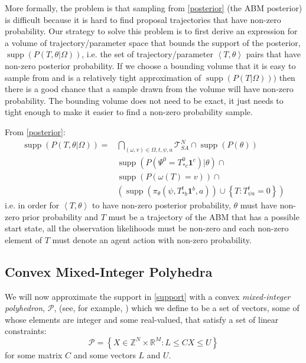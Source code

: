 \documentclass{article}
\DeclareMathOperator\supp{supp}
\begin{document}
More formally, the problem is that sampling from \eqref{posterior} (the ABM posterior) is difficult because it is hard to find proposal trajectories that have non-zero probability. Our strategy to solve this problem is to first derive an expression for a volume of trajectory/parameter space that bounds the support of the posterior, $\supp(P(T,\theta|\Omega))$, i.e. the set of trajectory/parameter $\left<T,\theta\right>$ pairs that have non-zero posterior probability. If we choose a bounding volume that it is easy to sample from and is a relatively tight approximation of $\supp(P(T|\Omega)))$ then there is a good chance that a sample drawn from the volume will have non-zero probability. The bounding volume does not need to be exact, it just needs to tight enough to make it easier to find a non-zero probability sample.

From \eqref{posterior}:
\begin{equation}
\begin{aligned}
\supp (P( T,\theta |\Omega)) = 
& \bigcap_{(\omega,v) \in \Omega,t, \psi, a} \mathcal{T}^N_{SA} \cap \supp(P(\theta)) \\ 
&\supp(P(\Psi^0 = T^0_{* c}\mathbf{1}^c)|\theta) \cap \\
& \supp\left(P\left(\omega(T)=v\right)\right) \cap \\
&\left( \supp\left(\pi_\theta(\psi,T^t_{* b}\mathbf{1}^b,a)\right) \cup \left\{T:T^t_{\psi a} = 0\right\} \right)
\end{aligned}
\label{support}
\end{equation}
i.e. in order for $\left<T,\theta\right>$ to have non-zero posterior probability, $\theta$ must have non-zero prior probability and $T$ must be a trajectory of the ABM that has a possible start state, all the observation likelihoods must be non-zero and each non-zero element of $T$ must denote an agent action with non-zero probability.

\subsection{Convex Mixed-Integer Polyhedra}
\label{BPoly}

We will now approximate the support in \eqref{support} with a convex \textit{mixed-integer polyhedron}, $\mathcal{P}$, (see, for example, \citet{conforti2010polyhedral}) which we define to be a set of vectors, some of whose elements are integer and some real-valued, that satisfy a set of linear constraints:
\[
\mathcal{P} = \left\{ X\in\mathbb{Z}^N \times \mathbb{R}^M : L \le  CX \le U \right\}
\]
for some matrix $C$ and some vectors $L$ and $U$.
\end{document}
